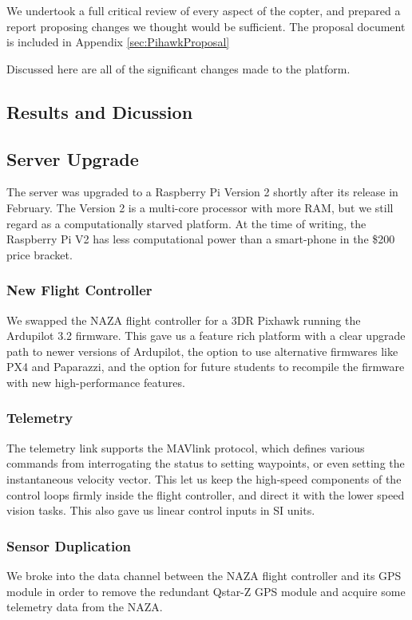 \documentclass{article}
\begin{document}
      We undertook a full critical review of every aspect of the copter, and prepared a report proposing changes we thought would be sufficient.  The proposal document is included in Appendix \ref{sec:PihawkProposal}

      Discussed here are all of the significant changes made to the platform.


  \subsection{Results and Dicussion}
    \subsection{Server Upgrade}
      The server was upgraded to a Raspberry Pi Version 2 shortly after its release in February.  The Version 2 is a multi-core processor with more RAM, but we still regard as a computationally starved platform.
      At the time of writing, the Raspberry Pi V2 has less computational power than a smart-phone in the \$200 price bracket.

    \subsubsection{New Flight Controller}
      We swapped the NAZA flight controller for a 3DR Pixhawk running the Ardupilot 3.2 firmware.  This gave us a feature rich platform with a clear upgrade path to newer versions of Ardupilot, the option to use alternative firmwares like PX4 and Paparazzi, and the option for future students to recompile the firmware with new high-performance features.

    \subsubsection{Telemetry}
      The telemetry link supports the MAVlink protocol, which defines various commands from interrogating the status to setting waypoints, or even setting the instantaneous velocity vector.
      This let us keep the high-speed components of the control loops firmly inside the flight controller, and direct it with the lower speed vision tasks.  This also gave us linear control inputs in SI units.

    \subsubsection{Sensor Duplication}
      We broke into the data channel between the NAZA flight controller and its GPS module in order to remove the redundant Qstar-Z GPS module and acquire some telemetry data from the NAZA.
\end{document}
